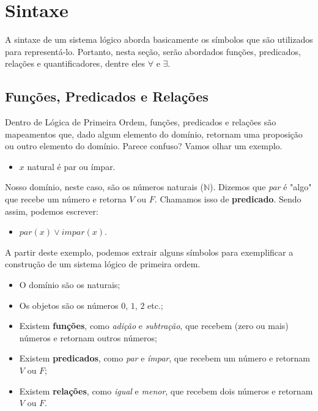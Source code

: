 \section{Sintaxe}

    A sintaxe de um sistema lógico aborda basicamente os símbolos que são utilizados para representá-lo. Portanto, nesta seção, serão abordados funções, predicados, relações e quantificadores, dentre eles $\forall$ e $\exists$.

    \subsection{Funções, Predicados e Relações}

        Dentro de Lógica de Primeira Ordem, funções, predicados e relações são mapeamentos que, dado algum elemento do domínio, retornam uma proposição ou outro elemento do domínio. Parece confuso? Vamos olhar um exemplo.

        \begin{itemize}
            \item $x$ natural é par ou ímpar.
        \end{itemize}

        Nosso domínio, neste caso, são os números naturais ($\mathbb{N}$). Dizemos que \textit{par} é "algo" que recebe um número e retorna $V$ ou $F$. Chamamos isso de \textbf{predicado}. Sendo assim, podemos escrever:

        \begin{itemize}
            \item $par(x) \lor impar(x)$.
        \end{itemize}

        A partir deste exemplo, podemos extrair alguns símbolos para exemplificar a construção de um sistema lógico de primeira ordem.

        \begin{itemize}
            \item O domínio são os naturais;
            \item Os objetos são os números $0$, $1$, $2$ etc.;
            \item Existem \textbf{funções}, como \textit{adição} e \textit{subtração}, que recebem (zero ou mais) números e retornam outros números;
            \item Existem \textbf{predicados}, como \textit{par} e \textit{ímpar}, que recebem um número e retornam $V$ ou $F$;
            \item Existem \textbf{relações}, como \textit{igual} e \textit{menor}, que recebem dois números e retornam $V$ ou $F$.
        \end{itemize}

